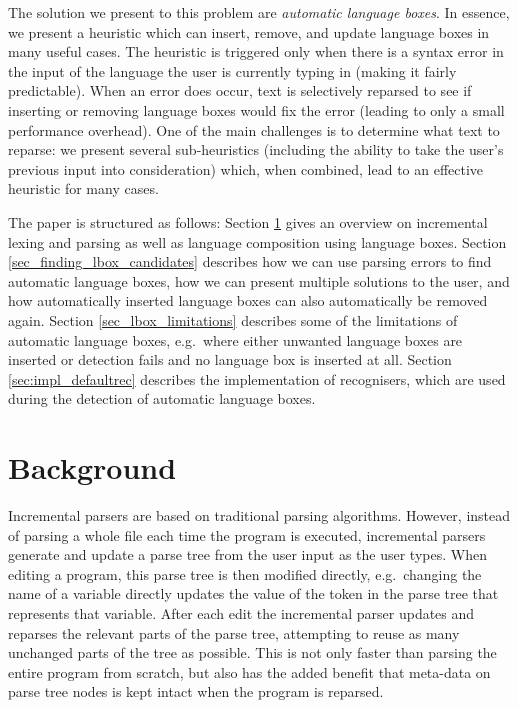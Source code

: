 \documentclass[sigplan,screen]{acmart}\settopmatter{printfolios=true,printccs=false,printacmref=false}
\begin{document}
The solution we present to this problem are \emph{automatic language boxes}. In
essence, we present a heuristic which can insert, remove, and update language
boxes in many useful cases. The heuristic is triggered only when there is a
syntax error in the input of the language the user is currently typing in
(making it fairly predictable). When an error does occur, text is selectively
reparsed to see if inserting or removing language boxes would fix the error
(leading to only a small performance overhead). One of the main challenges is
to determine what text to reparse: we present several sub-heuristics (including
the ability to take the user's previous input into consideration) which, when
combined, lead to an effective heuristic for many cases. 

The paper is structured as follows: Section \ref{sec_background} gives an
overview on incremental lexing and parsing as well as language composition
using language boxes. Section \ref{sec_finding_lbox_candidates}
describes how we can use parsing errors to find automatic language boxes, how
we can present multiple solutions to the user, and how automatically inserted
language boxes can also automatically be removed again. Section
\ref{sec_lbox_limitations} describes some of the limitations of automatic
language boxes, e.g.~where either unwanted language boxes are inserted or
detection fails and no language box is inserted at all. Section
\ref{sec:impl_defaultrec} describes the implementation of recognisers, which
are used during the detection of automatic language boxes.

\section{Background}
\label{sec_background}

Incremental parsers are based on traditional parsing algorithms. However,
instead of parsing a whole file each time the program is executed, incremental
parsers generate and update a parse tree from the user input as the user types.
When editing a program, this parse tree is then modified directly,
e.g.~changing the name of a variable directly updates the value of the token in
the parse tree that represents that variable. After each edit the incremental
parser updates and reparses the relevant parts of the parse tree, attempting to
reuse as many unchanged parts of the tree as possible. This is not only faster
than parsing the entire program from scratch, but also has the added benefit
that meta-data on parse tree nodes is kept intact when the program is reparsed.
\end{document}
